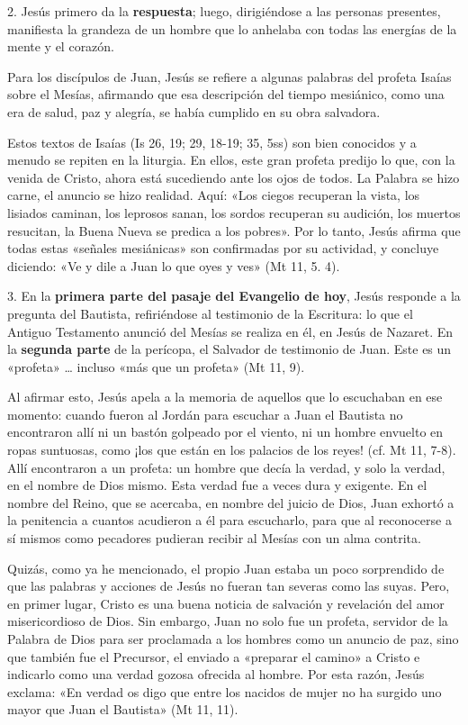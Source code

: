 \documentclass[]{article}
\begin{document}
2. Jesús primero da la \textbf{respuesta}; luego, dirigiéndose a las
personas presentes, manifiesta la grandeza de un hombre que lo anhelaba
con todas las energías de la mente y el corazón.

Para los discípulos de Juan, Jesús se refiere a algunas palabras del
profeta Isaías sobre el Mesías, afirmando que esa descripción del tiempo
mesiánico, como una era de salud, paz y alegría, se había cumplido en su
obra salvadora.

Estos textos de Isaías (Is 26, 19; 29, 18-19; 35, 5ss) son bien
conocidos y a menudo se repiten en la liturgia. En ellos, este gran
profeta predijo lo que, con la venida de Cristo, ahora está sucediendo
ante los ojos de todos. La Palabra se hizo carne, el anuncio se hizo
realidad. Aquí: «Los ciegos recuperan la vista, los lisiados caminan,
los leprosos sanan, los sordos recuperan su audición, los muertos
resucitan, la Buena Nueva se predica a los pobres». Por lo tanto, Jesús
afirma que todas estas «señales mesiánicas» son confirmadas por su
actividad, y concluye diciendo: «Ve y dile a Juan lo que oyes y ves» (Mt
11, 5. 4).

3. En la \textbf{primera parte del pasaje del Evangelio de hoy}, Jesús
responde a la pregunta del Bautista, refiriéndose al testimonio de la
Escritura: lo que el Antiguo Testamento anunció del Mesías se realiza en
él, en Jesús de Nazaret. En la \textbf{segunda parte} de la perícopa, el
Salvador de testimonio de Juan. Este es un «profeta» \ldots{} incluso
«más que un profeta» (Mt 11, 9).

Al afirmar esto, Jesús apela a la memoria de aquellos que lo escuchaban
en ese momento: cuando fueron al Jordán para escuchar a Juan el Bautista
no encontraron allí ni un bastón golpeado por el viento, ni un hombre
envuelto en ropas suntuosas, como ¡los que están en los palacios de los
reyes! (cf. Mt 11, 7-8). Allí encontraron a un profeta: un hombre que
decía la verdad, y solo la verdad, en el nombre de Dios mismo. Esta
verdad fue a veces dura y exigente. En el nombre del Reino, que se
acercaba, en nombre del juicio de Dios, Juan exhortó a la penitencia a
cuantos acudieron a él para escucharlo, para que al reconocerse a sí
mismos como pecadores pudieran recibir al Mesías con un alma contrita.

Quizás, como ya he mencionado, el propio Juan estaba un poco sorprendido
de que las palabras y acciones de Jesús no fueran tan severas como las
suyas. Pero, en primer lugar, Cristo es una buena noticia de salvación y
revelación del amor misericordioso de Dios. Sin embargo, Juan no solo
fue un profeta, servidor de la Palabra de Dios para ser proclamada a los
hombres como un anuncio de paz, sino que también fue el Precursor, el
enviado a «preparar el camino» a Cristo e indicarlo como una verdad
gozosa ofrecida al hombre. Por esta razón, Jesús exclama: «En verdad os
digo que entre los nacidos de mujer no ha surgido uno mayor que Juan el
Bautista» (Mt 11, 11).
\end{document}
